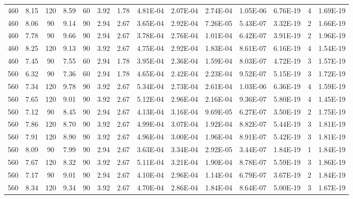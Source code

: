 \documentclass[%
 reprint,
 amsmath,amssymb,
 aps,
]{revtex4-2}
\begin{document}
\begin{table}[]
\begin{ruledtabular}
\begin{tabular}{cccccccccccccc}
    460 & 8.15 & 120 & 8.59 & 60 & 3.92 & 1.78 & 4.81E-04 & 2.07E-04 & 2.74E-04 & 1.05E-06 & 6.76E-19 & 4 & 1.69E-19 \\
    460 & 8.06 & 90  & 9.14 & 90 & 2.94 & 2.67 & 3.65E-04 & 2.92E-04 & 7.26E-05 & 5.43E-07 & 3.32E-19 & 2 & 1.66E-19 \\
    460 & 7.78 & 90  & 9.66 & 90 & 2.94 & 2.67 & 3.78E-04 & 2.76E-04 & 1.01E-04 & 6.42E-07 & 3.91E-19 & 2 & 1.96E-19 \\
    460 & 8.25 & 120 & 9.13 & 90 & 3.92 & 2.67 & 4.75E-04 & 2.92E-04 & 1.83E-04 & 8.61E-07 & 6.16E-19 & 4 & 1.54E-19 \\
    460 & 7.45 & 90  & 7.55 & 60 & 2.94 & 1.78 & 3.95E-04 & 2.36E-04 & 1.59E-04 & 8.03E-07 & 4.72E-19 & 3 & 1.57E-19 \\
    560 & 6.32 & 90  & 7.36 & 60 & 2.94 & 1.78 & 4.65E-04 & 2.42E-04 & 2.23E-04 & 9.52E-07 & 5.15E-19 & 3 & 1.72E-19 \\
    560 & 7.34 & 120 & 9.78 & 90 & 3.92 & 2.67 & 5.34E-04 & 2.73E-04 & 2.61E-04 & 1.03E-06 & 6.36E-19 & 4 & 1.59E-19 \\
    560 & 7.65 & 120 & 9.01 & 90 & 3.92 & 2.67 & 5.12E-04 & 2.96E-04 & 2.16E-04 & 9.36E-07 & 5.80E-19 & 4 & 1.45E-19 \\
    560 & 7.12 & 90  & 8.45 & 90 & 2.94 & 2.67 & 4.13E-04 & 3.16E-04 & 9.69E-05 & 6.27E-07 & 3.50E-19 & 2 & 1.75E-19 \\
    560 & 7.86 & 120 & 8.70 & 90 & 3.92 & 2.67 & 4.99E-04 & 3.07E-04 & 1.92E-04 & 8.82E-07 & 5.44E-19 & 3 & 1.81E-19 \\
    560 & 7.91 & 120 & 8.90 & 90 & 3.92 & 2.67 & 4.96E-04 & 3.00E-04 & 1.96E-04 & 8.91E-07 & 5.42E-19 & 3 & 1.81E-19 \\
    560 & 8.09 & 90  & 7.99 & 90 & 2.94 & 2.67 & 3.63E-04 & 3.34E-04 & 2.92E-05 & 3.44E-07 & 1.84E-19 & 1 & 1.84E-19 \\
    560 & 7.67 & 120 & 8.32 & 90 & 3.92 & 2.67 & 5.11E-04 & 3.21E-04 & 1.90E-04 & 8.78E-07 & 5.59E-19 & 3 & 1.86E-19 \\
    560 & 7.17 & 90  & 9.01 & 90 & 2.94 & 2.67 & 4.10E-04 & 2.96E-04 & 1.14E-04 & 6.79E-07 & 3.67E-19 & 2 & 1.84E-19 \\
    560 & 8.34 & 120 & 9.34 & 90 & 3.92 & 2.67 & 4.70E-04 & 2.86E-04 & 1.84E-04 & 8.64E-07 & 5.00E-19 & 3 & 1.67E-19 \\ \hline
    \end{tabular}
    \end{ruledtabular}
    \end{table}
    
\end{document}

